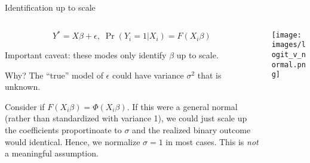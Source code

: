 \documentclass[notes,11pt, aspectratio=169]{beamer}
\newenvironment{wideitemize}{\itemize\addtolength{\itemsep}{10pt}}{\enditemize}
\begin{document}
  \begin{frame}{Identification up to scale}
  \begin{columns}[T] %
    \begin{column}{.6\textwidth}
  $$Y^{*} = X\beta + \epsilon,  \; \Pr(Y_{i} =1|X_{i}) = F(X_{i}\beta)  $$

  \begin{wideitemize}
  \item  Important caveat: these modes only identify $\beta$  up to scale.
  \item   Why?  The ``true'' model of $\epsilon$ could have variance
    $\sigma^{2}$ that is unknown.
  \item Consider if $F(X_{i}\beta) = \Phi(X_{i}\beta)$. If this were a
    general normal (rather than standardized with variance 1), we
    could just scale up the coefficients proportinoate to $\sigma$ and
    the realized binary outcome would identical.  Hence, we normalize
    $\sigma = 1$ in most cases. This is \emph{not} a meaningful
    assumption.
  \end{wideitemize}

    \end{column}%
  \hfill%
  \begin{column}{.4\textwidth}
    \begin{center}
      \texttt{[image: images/logit\_v\_normal.png]}
    \end{center}
  \end{column}
\end{columns}
  \end{frame}
\end{document}

